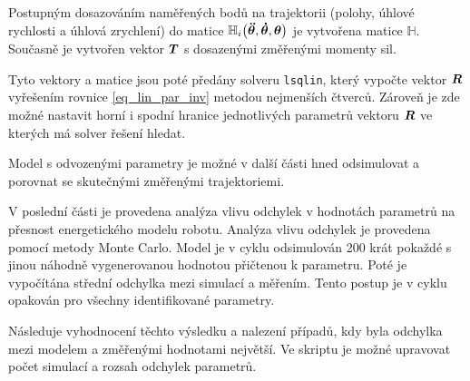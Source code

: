 Postupným dosazováním naměřených bodů na trajektorii (polohy, úhlové rychlosti a úhlová zrychlení) do matice $\mathbb{H}_i\big(\boldsymbol{\ddot{\theta}},\boldsymbol{\dot{\theta}},\boldsymbol{\theta}\big)$ je vytvořena matice $\mathbb{H}$. Současně je vytvořen vektor $\boldsymbol{T}$ s dosazenými změřenými momenty sil.

\newpage
Tyto vektory a matice jsou poté předány solveru \texttt{lsqlin}, který vypočte vektor $\boldsymbol{R}$ vyřešením rovnice \eqref{eq_lin_par_inv} metodou nejmenších čtverců. Zároveň je zde možné nastavit horní i spodní hranice jednotlivých parametrů vektoru $\boldsymbol{R}$ ve kterých má solver řešení hledat.

Model s odvozenými parametry je možné v další části hned odsimulovat a porovnat se skutečnými změřenými trajektoriemi.

V poslední části je provedena analýza vlivu odchylek v hodnotách parametrů na přesnost energetického modelu robotu. Analýza vlivu odchylek je provedena pomocí metody Monte Carlo. Model je v cyklu odsimulován 200 krát pokaždé s jinou náhodně vygenerovanou hodnotou přičtenou k parametru. Poté je vypočítána střední odchylka mezi simulací a měřením. Tento postup je v cyklu opakován pro všechny identifikované parametry. 

Následuje vyhodnocení těchto výsledku a nalezení případů, kdy byla odchylka mezi modelem a změřenými hodnotami největší. Ve skriptu je možné upravovat počet simulací a rozsah odchylek parametrů.  

